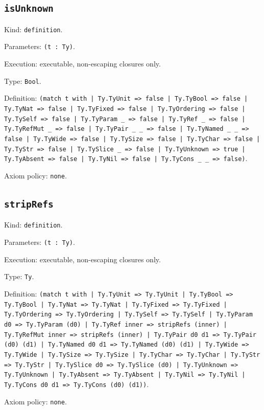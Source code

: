 \documentclass[11pt]{article}
\begin{document}
\subsection*{\texttt{isUnknown}}
\noindent Kind: \texttt{definition}.\par
\noindent Parameters: \texttt{(t : Ty)}.\par
\noindent Execution: executable, non-escaping closures only.\par
\noindent Type: \texttt{Bool}.\par
\noindent Definition: \texttt{(match t with | Ty.TyUnit => false | Ty.TyBool => false | Ty.TyNat => false | Ty.TyFixed => false | Ty.TyOrdering => false | Ty.TySelf => false | Ty.TyParam \_ => false | Ty.TyRef \_ => false | Ty.TyRefMut \_ => false | Ty.TyPair \_ \_ => false | Ty.TyNamed \_ \_ => false | Ty.TyWide => false | Ty.TySize => false | Ty.TyChar => false | Ty.TyStr => false | Ty.TySlice \_ => false | Ty.TyUnknown => true | Ty.TyAbsent => false | Ty.TyNil => false | Ty.TyCons \_ \_ => false)}.\par
\noindent Axiom policy: \texttt{none}.\par
\subsection*{\texttt{stripRefs}}
\noindent Kind: \texttt{definition}.\par
\noindent Parameters: \texttt{(t : Ty)}.\par
\noindent Execution: executable, non-escaping closures only.\par
\noindent Type: \texttt{Ty}.\par
\noindent Definition: \texttt{(match t with | Ty.TyUnit => Ty.TyUnit | Ty.TyBool => Ty.TyBool | Ty.TyNat => Ty.TyNat | Ty.TyFixed => Ty.TyFixed | Ty.TyOrdering => Ty.TyOrdering | Ty.TySelf => Ty.TySelf | Ty.TyParam d0 => Ty.TyParam (d0) | Ty.TyRef inner => stripRefs (inner) | Ty.TyRefMut inner => stripRefs (inner) | Ty.TyPair d0 d1 => Ty.TyPair (d0) (d1) | Ty.TyNamed d0 d1 => Ty.TyNamed (d0) (d1) | Ty.TyWide => Ty.TyWide | Ty.TySize => Ty.TySize | Ty.TyChar => Ty.TyChar | Ty.TyStr => Ty.TyStr | Ty.TySlice d0 => Ty.TySlice (d0) | Ty.TyUnknown => Ty.TyUnknown | Ty.TyAbsent => Ty.TyAbsent | Ty.TyNil => Ty.TyNil | Ty.TyCons d0 d1 => Ty.TyCons (d0) (d1))}.\par
\noindent Axiom policy: \texttt{none}.\par
\end{document}
